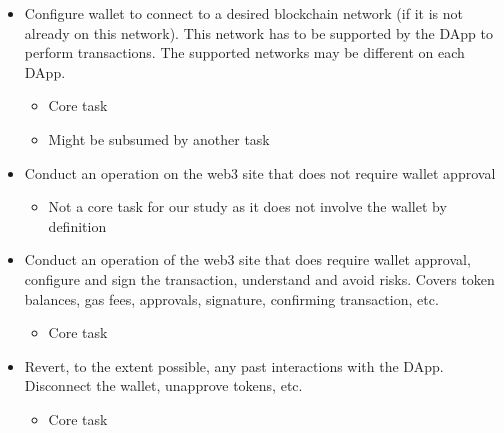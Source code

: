 \documentclass[conference]{IEEEtran}
\begin{document}
\begin{itemize}
	\item Configure wallet to connect to a desired blockchain network (if it is not already on this network). This network has to be supported by the DApp to perform transactions. The supported networks may be different on each DApp. 
		\begin{itemize}
  			\item Core task
  			\item Might be subsumed by another task
		\end{itemize}

	\item Conduct an operation on the web3 site that does not require wallet approval
		\begin{itemize}
  			\item Not a core task for our study as it does not involve the wallet by definition
		\end{itemize}

	\item Conduct an operation of the web3 site that does require wallet approval, configure and sign the transaction, understand and avoid risks. Covers token balances, gas fees, approvals, signature, confirming transaction, etc.
		\begin{itemize}
  			\item Core task
		\end{itemize} 

	\item Revert, to the extent possible, any past interactions with the DApp. Disconnect the wallet, unapprove tokens, etc.
		\begin{itemize}
 			\item Core task 
		\end{itemize}
\end{itemize}
\end{document}
